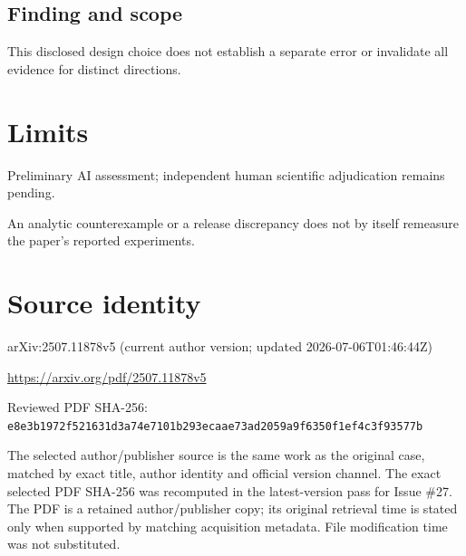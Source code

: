 \documentclass[11pt]{article}
\begin{document}
\subsection*{Finding and scope}

This disclosed design choice does not establish a separate error or invalidate all evidence for distinct directions.

\section*{Limits}

Preliminary AI assessment; independent human scientific adjudication remains pending.\par

An analytic counterexample or a release discrepancy does not by itself remeasure the paper’s reported experiments.\par

\section*{Source identity}

arXiv:2507.11878v5 (current author version; updated 2026-07-06T01:46:44Z)

\url{https://arxiv.org/pdf/2507.11878v5}

Reviewed PDF SHA-256: \nolinkurl{e8e3b1972f521631d3a74e7101b293ecaae73ad2059a9f6350f1ef4c3f93577b}

The selected author/publisher source is the same work as the original case, matched by exact title, author identity and official version channel. The exact selected PDF SHA-256 was recomputed in the latest-version pass for Issue \#27. The PDF is a retained author/publisher copy; its original retrieval time is stated only when supported by matching acquisition metadata. File modification time was not substituted.
\end{document}
